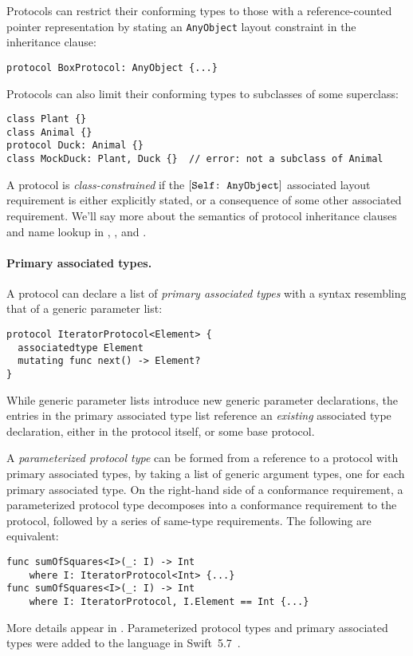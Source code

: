 \documentclass[../generics]{subfiles}
\begin{document}
Protocols can restrict their conforming types to those with a reference-counted pointer representation by stating an \texttt{AnyObject} layout constraint in the inheritance clause:
\begin{Verbatim}
protocol BoxProtocol: AnyObject {...}
\end{Verbatim}

Protocols can also limit their conforming types to subclasses of some superclass:
\begin{Verbatim}
class Plant {}
class Animal {}
protocol Duck: Animal {}
class MockDuck: Plant, Duck {}  // error: not a subclass of Animal
\end{Verbatim}
A protocol is \emph{class-constrained} if the $[\texttt{Self:~AnyObject}]$ associated layout requirement is either explicitly stated, or a consequence of some other associated requirement. We'll say more about the semantics of protocol inheritance clauses and name lookup in , , and .

\paragraph{Primary associated types.}
A protocol can declare a list of \emph{primary associated types} with a syntax resembling that of a generic parameter list:
\begin{Verbatim}
protocol IteratorProtocol<Element> {
  associatedtype Element
  mutating func next() -> Element?
}
\end{Verbatim}
While generic parameter lists introduce new generic parameter declarations, the entries in the primary associated type list reference an \emph{existing} associated type declaration, either in the protocol itself, or some base protocol.

A \emph{parameterized protocol type} can be formed from a reference to a protocol with primary associated types, by taking a list of generic argument types, one for each primary associated type. On the right-hand side of a conformance requirement, a parameterized protocol type decomposes into a conformance requirement to the protocol, followed by a series of same-type requirements. The following are equivalent:
\begin{Verbatim}
func sumOfSquares<I>(_: I) -> Int
    where I: IteratorProtocol<Int> {...}
func sumOfSquares<I>(_: I) -> Int
    where I: IteratorProtocol, I.Element == Int {...}
\end{Verbatim}
More details appear in . Parameterized protocol types and primary associated types were added to the language in Swift~5.7~\cite{se0346}. 
\end{document}
